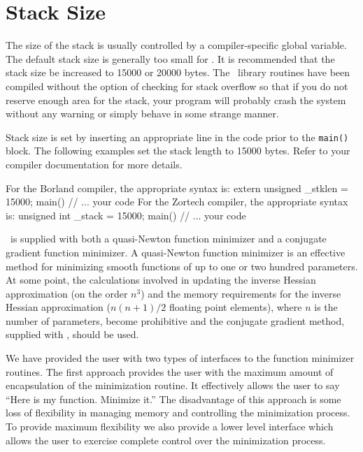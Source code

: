 \documentclass[12pt]{book}
\begin{document}
\section{Stack Size}
The size of the stack is usually controlled by a compiler-specific global
variable. The default stack size is generally too small for \AD.
It is recommended that the stack size be increased to 15000 or 20000 bytes.
The \AD\ library routines have been
compiled without the option of checking 
for stack overflow so that if you do not
reserve enough area for the stack, your program will probably crash
the system without any warning or simply behave in some strange manner. 

Stack size is set by inserting an appropriate line in the code prior
to the {\tt main()} block.
The following examples set the stack length to 15000 bytes.
Refer to your compiler documentation for more details.

 
For the Borland compiler, the appropriate syntax is:
\beginexample
extern unsigned _stklen = 15000; 
main()
{
  // ... your code
}
\endexample
{} 
\noindent For the Zortech compiler, the appropriate syntax is:
\beginexample
unsigned int _stack = 15000; 
main()
{
  // ... your code
}
\endexample

\endchapter

\htmlnewfile 
\AD\ is supplied with both a quasi-Newton function minimizer
and a conjugate gradient function minimizer.
A quasi-Newton function minimizer
is an effective method for minimizing smooth functions of up to one 
or two hundred parameters. At some point, the calculations involved in
updating the inverse Hessian approximation (on the order
$n^3$) and the memory requirements for
the inverse Hessian approximation ($n(n+1)/2$ floating point elements), 
where $n$ is the number of parameters, become prohibitive
and the conjugate gradient method, supplied with \AD, should
be used.  

We have provided the user
with two types of interfaces to the function minimizer routines. The first approach provides the user with the maximum amount of encapsulation of the
minimization routine. It effectively allows the user to say ``Here is my
function. Minimize it.'' The disadvantage of this approach is some loss of
flexibility in managing memory and controlling the minimization
process. To provide maximum flexibility we also provide a lower level interface
which allows the user to exercise complete control over the minimization 
process.
\end{document}
